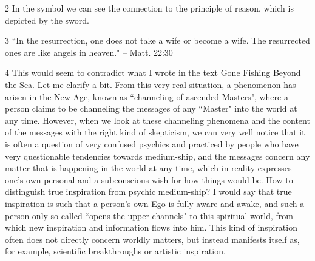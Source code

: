 \begin{footnotesize}
\begin{sffamily}
2 In the symbol we can see the connection to the principle of reason, which is depicted by the sword.

3 ``In the resurrection, one does not take a wife or become a wife. The resurrected ones are like angels in heaven." – Matt. 22:30

4 This would seem to contradict what I wrote in the text Gone Fishing Beyond the Sea. Let me clarify a bit. From this very real situation, a phenomenon has arisen in the New Age, known as ``channeling of ascended Masters", where a person claims to be channeling the messages of any ``Master" into the world at any time. However, when we look at these channeling phenomena and the content of the messages with the right kind of skepticism, we can very well notice that it is often a question of very confused psychics and practiced by people who have very questionable tendencies towards medium-ship, and the messages concern any matter that is happening in the world at any time, which in reality expresses one's own personal and a subconscious wish for how things would be. How to distinguish true inspiration from psychic medium-ship? I would say that true inspiration is such that a person's own Ego is fully aware and awake, and such a person only so-called ``opens the upper channels" to this spiritual world, from which new inspiration and information flows into him. This kind of inspiration often does not directly concern worldly matters, but instead manifests itself as, for example, scientific breakthroughs or artistic inspiration.


\hfill


\end{sffamily}\end{footnotesize}
